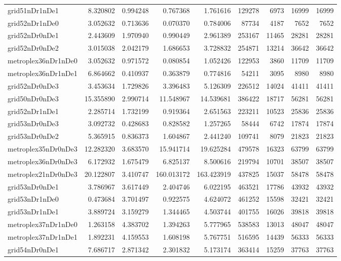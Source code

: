 \begin{longtable}{|l|r|r|r|r|r|r|r|r|}
grid51nDr1nDe1 & 8.320802 & 0.994248 & 0.767368 & 1.761616 & 129278 & 6973 & 16999 & 16999 \\
grid52nDr1nDe0 & 3.052632 & 0.713636 & 0.070370 & 0.784006 & 87734 & 4187 & 7652 & 7652 \\
grid52nDr0nDe1 & 2.443609 & 1.970940 & 0.990449 & 2.961389 & 253167 & 11465 & 28281 & 28281 \\
grid52nDr0nDe2 & 3.015038 & 2.042179 & 1.686653 & 3.728832 & 254871 & 13214 & 36642 & 36642 \\
metroplex36nDr1nDe0 & 3.052632 & 0.971572 & 0.080854 & 1.052426 & 122953 & 3860 & 11709 & 11709 \\
metroplex36nDr1nDe1 & 6.864662 & 0.410937 & 0.363879 & 0.774816 & 54211 & 3095 & 8980 & 8980 \\
grid52nDr0nDe3 & 3.453634 & 1.729826 & 3.396483 & 5.126309 & 226512 & 14024 & 41411 & 41411 \\
grid50nDr0nDe3 & 15.355890 & 2.990714 & 11.548967 & 14.539681 & 386422 & 18717 & 56281 & 56281 \\
grid52nDr1nDe1 & 2.285714 & 1.732199 & 0.919364 & 2.651563 & 223211 & 10523 & 25836 & 25836 \\
grid53nDr0nDe3 & 3.092732 & 0.428683 & 0.828582 & 1.257265 & 58444 & 6742 & 17874 & 17874 \\
grid53nDr0nDe2 & 5.365915 & 0.836373 & 1.604867 & 2.441240 & 109741 & 8079 & 21823 & 21823 \\
metroplex35nDr0nDe3 & 12.282320 & 3.683570 & 15.941714 & 19.625284 & 479578 & 16323 & 63799 & 63799 \\
metroplex36nDr0nDe3 & 6.172932 & 1.675479 & 6.825137 & 8.500616 & 219794 & 10701 & 38507 & 38507 \\
metroplex21nDr0nDe3 & 20.122807 & 3.410747 & 160.013172 & 163.423919 & 437825 & 15037 & 58478 & 58478 \\
grid53nDr0nDe1 & 3.786967 & 3.617449 & 2.404746 & 6.022195 & 463521 & 17786 & 43932 & 43932 \\
grid53nDr1nDe0 & 0.473684 & 3.701497 & 0.922575 & 4.624072 & 461252 & 15598 & 32421 & 32421 \\
grid53nDr1nDe1 & 3.889724 & 3.159279 & 1.344465 & 4.503744 & 401755 & 16026 & 39818 & 39818 \\
metroplex37nDr1nDe0 & 1.263158 & 4.383702 & 1.394263 & 5.777965 & 538583 & 13013 & 48047 & 48047 \\
metroplex37nDr1nDe1 & 1.892231 & 4.159553 & 1.608198 & 5.767751 & 516595 & 14439 & 56333 & 56333 \\
grid54nDr0nDe1 & 7.686717 & 2.871342 & 2.301832 & 5.173174 & 363414 & 15259 & 37763 & 37763 \\

\end{longtable}
